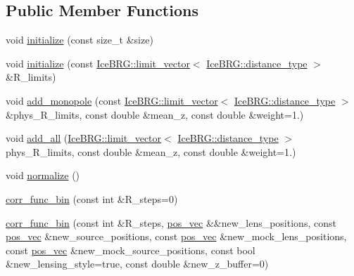 \subsection*{Public Member Functions}
\begin{DoxyCompactItemize}
\item 
void \hyperlink{structcorr__func__bin_a8ee2dfe994831ccd565d2afaf6559d1c}{initialize} (const size\+\_\+t \&size)
\item 
void \hyperlink{structcorr__func__bin_acee1fef21f10e33c8ca6c374982eb313}{initialize} (const \hyperlink{classIceBRG_1_1limit__vector}{Ice\+B\+R\+G\+::limit\+\_\+vector}$<$ \hyperlink{namespaceIceBRG_a45499647eb87e24c10ab32c628711cec}{Ice\+B\+R\+G\+::distance\+\_\+type} $>$ \&R\+\_\+limits)
\item 
void \hyperlink{structcorr__func__bin_a1f64500034d0f8e227cf1e96c2bfed14}{add\+\_\+monopole} (const \hyperlink{classIceBRG_1_1limit__vector}{Ice\+B\+R\+G\+::limit\+\_\+vector}$<$ \hyperlink{namespaceIceBRG_a45499647eb87e24c10ab32c628711cec}{Ice\+B\+R\+G\+::distance\+\_\+type} $>$ \&phys\+\_\+\+R\+\_\+limits, const double \&mean\+\_\+z, const double \&weight=1.)
\item 
void \hyperlink{structcorr__func__bin_a888e1a946ff971f9ccf60a7d7e3aa2af}{add\+\_\+all} (\hyperlink{classIceBRG_1_1limit__vector}{Ice\+B\+R\+G\+::limit\+\_\+vector}$<$ \hyperlink{namespaceIceBRG_a45499647eb87e24c10ab32c628711cec}{Ice\+B\+R\+G\+::distance\+\_\+type} $>$ phys\+\_\+\+R\+\_\+limits, const double \&mean\+\_\+z, const double \&weight=1.)
\item 
void \hyperlink{structcorr__func__bin_a4d7626836ca9329d179520ca72d6af0d}{normalize} ()
\item 
\hyperlink{structcorr__func__bin_a32ec71e0d9ae366bc3b103260e662567}{corr\+\_\+func\+\_\+bin} (const int \&R\+\_\+steps=0)
\item 
\hyperlink{structcorr__func__bin_adc153b1daa54da93bdb3a47c8d1873ea}{corr\+\_\+func\+\_\+bin} (const int \&R\+\_\+steps, \hyperlink{structcorr__func__bin_a683c7075740b3dcae9ebb1ac758c0bfa}{pos\+\_\+vec} \&\&new\+\_\+lens\+\_\+positions, const \hyperlink{structcorr__func__bin_a683c7075740b3dcae9ebb1ac758c0bfa}{pos\+\_\+vec} \&new\+\_\+source\+\_\+positions, const \hyperlink{structcorr__func__bin_a683c7075740b3dcae9ebb1ac758c0bfa}{pos\+\_\+vec} \&new\+\_\+mock\+\_\+lens\+\_\+positions, const \hyperlink{structcorr__func__bin_a683c7075740b3dcae9ebb1ac758c0bfa}{pos\+\_\+vec} \&new\+\_\+mock\+\_\+source\+\_\+positions, const bool \&new\+\_\+lensing\+\_\+style=true, const double \&new\+\_\+z\+\_\+buffer=0)

\end{DoxyCompactItemize}
